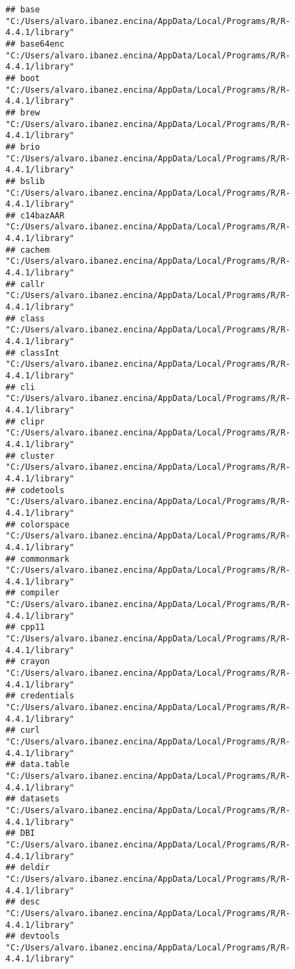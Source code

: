 \documentclass[
]{article}
\begin{document}
\begin{verbatim}
## base               "C:/Users/alvaro.ibanez.encina/AppData/Local/Programs/R/R-4.4.1/library"
## base64enc          "C:/Users/alvaro.ibanez.encina/AppData/Local/Programs/R/R-4.4.1/library"
## boot               "C:/Users/alvaro.ibanez.encina/AppData/Local/Programs/R/R-4.4.1/library"
## brew               "C:/Users/alvaro.ibanez.encina/AppData/Local/Programs/R/R-4.4.1/library"
## brio               "C:/Users/alvaro.ibanez.encina/AppData/Local/Programs/R/R-4.4.1/library"
## bslib              "C:/Users/alvaro.ibanez.encina/AppData/Local/Programs/R/R-4.4.1/library"
## c14bazAAR          "C:/Users/alvaro.ibanez.encina/AppData/Local/Programs/R/R-4.4.1/library"
## cachem             "C:/Users/alvaro.ibanez.encina/AppData/Local/Programs/R/R-4.4.1/library"
## callr              "C:/Users/alvaro.ibanez.encina/AppData/Local/Programs/R/R-4.4.1/library"
## class              "C:/Users/alvaro.ibanez.encina/AppData/Local/Programs/R/R-4.4.1/library"
## classInt           "C:/Users/alvaro.ibanez.encina/AppData/Local/Programs/R/R-4.4.1/library"
## cli                "C:/Users/alvaro.ibanez.encina/AppData/Local/Programs/R/R-4.4.1/library"
## clipr              "C:/Users/alvaro.ibanez.encina/AppData/Local/Programs/R/R-4.4.1/library"
## cluster            "C:/Users/alvaro.ibanez.encina/AppData/Local/Programs/R/R-4.4.1/library"
## codetools          "C:/Users/alvaro.ibanez.encina/AppData/Local/Programs/R/R-4.4.1/library"
## colorspace         "C:/Users/alvaro.ibanez.encina/AppData/Local/Programs/R/R-4.4.1/library"
## commonmark         "C:/Users/alvaro.ibanez.encina/AppData/Local/Programs/R/R-4.4.1/library"
## compiler           "C:/Users/alvaro.ibanez.encina/AppData/Local/Programs/R/R-4.4.1/library"
## cpp11              "C:/Users/alvaro.ibanez.encina/AppData/Local/Programs/R/R-4.4.1/library"
## crayon             "C:/Users/alvaro.ibanez.encina/AppData/Local/Programs/R/R-4.4.1/library"
## credentials        "C:/Users/alvaro.ibanez.encina/AppData/Local/Programs/R/R-4.4.1/library"
## curl               "C:/Users/alvaro.ibanez.encina/AppData/Local/Programs/R/R-4.4.1/library"
## data.table         "C:/Users/alvaro.ibanez.encina/AppData/Local/Programs/R/R-4.4.1/library"
## datasets           "C:/Users/alvaro.ibanez.encina/AppData/Local/Programs/R/R-4.4.1/library"
## DBI                "C:/Users/alvaro.ibanez.encina/AppData/Local/Programs/R/R-4.4.1/library"
## deldir             "C:/Users/alvaro.ibanez.encina/AppData/Local/Programs/R/R-4.4.1/library"
## desc               "C:/Users/alvaro.ibanez.encina/AppData/Local/Programs/R/R-4.4.1/library"
## devtools           "C:/Users/alvaro.ibanez.encina/AppData/Local/Programs/R/R-4.4.1/library"

\end{verbatim}
\end{document}
